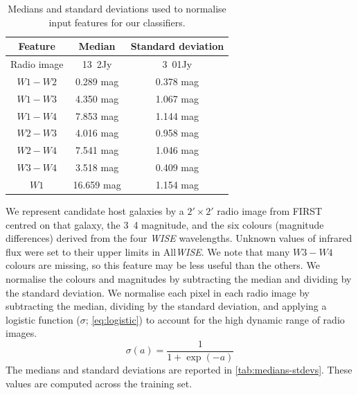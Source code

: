 \begin{table}
  \caption{Medians and standard deviations used to normalise input features for our classifiers.
    \label{tab:medians-stdevs}}
    \centering
  \begin{tabular}{ccc}
    \hline\hline
    Feature & Median & Standard deviation\\
    \hline
    Radio image & \unit{13.2}{\micro{}Jy} & \unit{3.01}{\milli{}Jy}\\
    $W1 - W2$ & 0.289 mag & 0.378 mag\\
    $W1 - W3$ & 4.350 mag & 1.067 mag\\
    $W1 - W4$ & 7.853 mag & 1.144 mag\\
    $W2 - W3$ & 4.016 mag & 0.958 mag\\
    $W2 - W4$ & 7.541 mag & 1.046 mag\\
    $W3 - W4$ & 3.518 mag & 0.409 mag\\
    $W1$ & 16.659 mag & 1.154 mag\\
    \hline\hline
  \end{tabular}
\end{table}

We represent candidate host galaxies by a $2' \times 2'$ radio image from FIRST centred on that galaxy, the \unit{3.4}{\micro\meter} magnitude, and the six colours (magnitude differences) derived from the four \emph{WISE} wavelengths. Unknown values of infrared flux were set to their upper limits in All\emph{WISE}. We note
that many $W3-W4$ colours are missing, so this feature may be less useful than
the others. We normalise the colours and magnitudes by subtracting the median and
dividing by the standard deviation. We normalise each
pixel in each radio image by subtracting the median, dividing by the standard
deviation, and applying a logistic function ($\sigma$;
\autoref{eq:logistic}) to account for the high dynamic range of radio
images.
\begin{equation}
  \sigma(a) = \frac{1}{1 + \exp(-a)}
  \label{eq:logistic}
\end{equation}
The medians and standard deviations are reported in \autoref{tab:medians-stdevs}. These values are computed across the training set.

